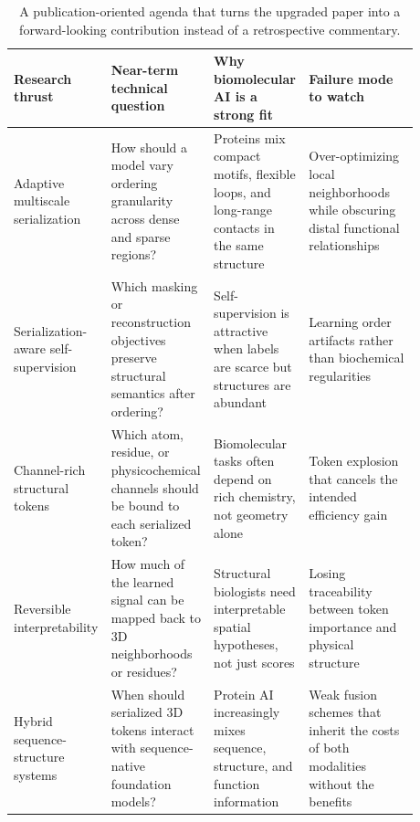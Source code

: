 \begin{table}[t]
\centering
\footnotesize
\begin{tabular}{L{0.21\linewidth} L{0.20\linewidth} L{0.20\linewidth} L{0.27\linewidth}}
\toprule
Research thrust & Near-term technical question & Why biomolecular AI is a strong fit & Failure mode to watch \\
\midrule
Adaptive multiscale serialization & How should a model vary ordering granularity across dense and sparse regions? & Proteins mix compact motifs, flexible loops, and long-range contacts in the same structure & Over-optimizing local neighborhoods while obscuring distal functional relationships \\
Serialization-aware self-supervision & Which masking or reconstruction objectives preserve structural semantics after ordering? & Self-supervision is attractive when labels are scarce but structures are abundant & Learning order artifacts rather than biochemical regularities \\
Channel-rich structural tokens & Which atom, residue, or physicochemical channels should be bound to each serialized token? & Biomolecular tasks often depend on rich chemistry, not geometry alone & Token explosion that cancels the intended efficiency gain \\
Reversible interpretability & How much of the learned signal can be mapped back to 3D neighborhoods or residues? & Structural biologists need interpretable spatial hypotheses, not just scores & Losing traceability between token importance and physical structure \\
Hybrid sequence-structure systems & When should serialized 3D tokens interact with sequence-native foundation models? & Protein AI increasingly mixes sequence, structure, and function information & Weak fusion schemes that inherit the costs of both modalities without the benefits \\
\bottomrule
\end{tabular}
\caption{A publication-oriented agenda that turns the upgraded paper into a forward-looking contribution instead of a retrospective commentary.}
\label{tab:agenda}
\end{table}
